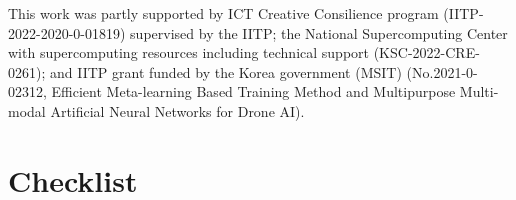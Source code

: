 \documentclass{article}
\begin{document}
\begin{ack}
This work was partly supported by ICT Creative Consilience program (IITP-2022-2020-0-01819) supervised by the IITP; the National Supercomputing Center with supercomputing resources including technical support (KSC-2022-CRE-0261); and IITP grant funded by the Korea government (MSIT) (No.2021-0-02312, Efficient Meta-learning Based Training Method and Multipurpose Multi-modal Artificial Neural Networks for Drone AI).
\end{ack}
 
 


\newpage


\section*{Checklist}
\end{document}
